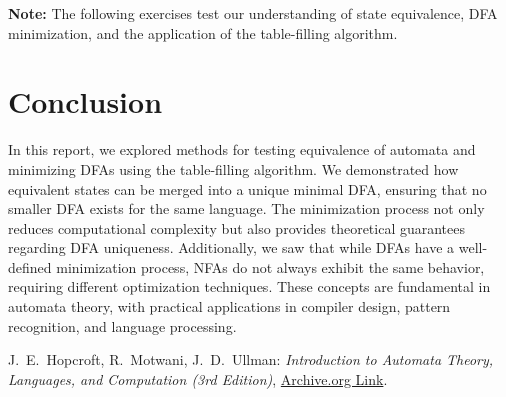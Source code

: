 \documentclass{article}
\theoremstyle{theorem}
\theoremstyle{definition}
\theoremstyle{remark}
\begin{document}
\textbf{Note:} The following exercises test our understanding of state equivalence, DFA minimization, and the application of the table-filling algorithm.


\newpage
\section{Conclusion}

In this report, we explored methods for testing equivalence of automata and minimizing DFAs using the table-filling algorithm. We demonstrated how equivalent states can be merged into a unique minimal DFA, ensuring that no smaller DFA exists for the same language. The minimization process not only reduces computational complexity but also provides theoretical guarantees regarding DFA uniqueness. Additionally, we saw that while DFAs have a well-defined minimization process, NFAs do not always exhibit the same behavior, requiring different optimization techniques. These concepts are fundamental in automata theory, with practical applications in compiler design, pattern recognition, and language processing.

\newpage
\begin{thebibliography}{99}
    \bibitem[HMU] J.~E.~Hopcroft, R.~Motwani, J.~D.~Ullman: 
    \emph{Introduction to Automata Theory, Languages, and Computation (3rd Edition)}, 
    \href{https://archive.org/details/hopcroft-motwani-ullman-introduction-to-automata-theory-languages-and-computations-3rd-edition/page/65/mode/1up?view=theater}{Archive.org Link}.
\end{thebibliography}
\end{document}
